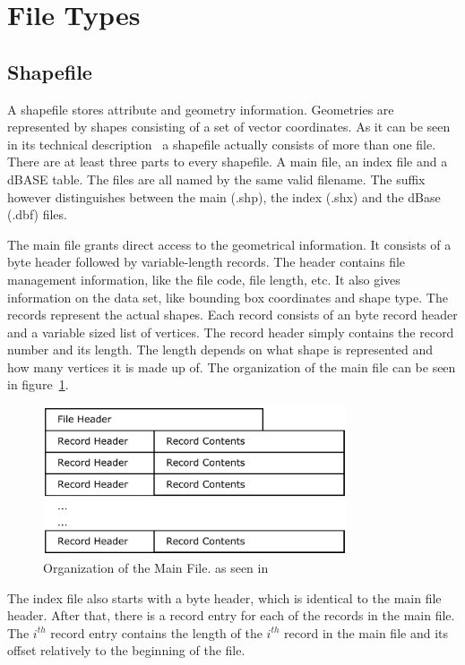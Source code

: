 \section{File Types}
\subsection{Shapefile}
A shapefile stores attribute and geometry information. Geometries are represented by shapes consisting of a set of vector coordinates. As it can be seen in its technical description~\cite{ersi:shp} a shapefile actually consists of more than one file. There are at least three parts to every shapefile. A main file, an index file and a dBASE table. The files are all named by the same valid filename. The suffix however distinguishes between the main (.shp), the index (.shx) and the dBase (.dbf) files.

The main file grants direct access to the geometrical information. It consists of a \unit[100]{byte} header followed by variable-length records. The header contains file management information, like the file code, file length, etc. It also gives information on the data set, like bounding box coordinates and shape type. The records represent the actual shapes. Each record consists of an \unit[8]{byte} record header and a variable sized list of vertices. The record header simply contains the record number and its length. The length depends on what shape is represented and how many vertices it is made up of. The organization of the main file can be seen in figure~\ref{fig:main-orga}.
\begin{figure}\begin{center}
  \includegraphics[width=0.8\textwidth]{pictures/Shapefile}
  \caption[Organization of the Main File]{Organization of the Main File. as seen in \cite{ersi:shp}}\label{fig:main-orga}
\end{center}\end{figure}

The index file also starts with a \unit[100]{byte} header, which is identical to the main file header. After that, there is a record entry for each of the records in the main file. The $i^{th}$ record entry contains the length of the $i^{th}$ record in the main file and its offset relatively to the beginning of the file.

